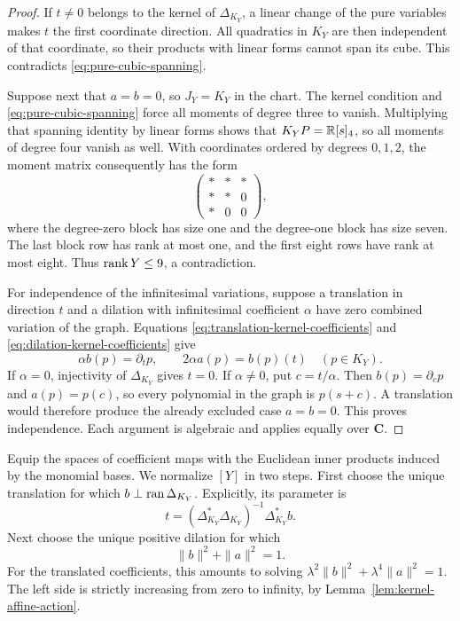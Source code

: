 \begin{proof}
If $t\ne0$ belongs to the kernel of $\Delta_{K_Y}$, a linear change of
the pure variables makes $t$ the first coordinate direction. All
quadratics in $K_Y$ are then independent of that coordinate, so their
products with linear forms cannot span its cube. This contradicts
\eqref{eq:pure-cubic-spanning}.

Suppose next that $a=b=0$, so $J_Y=K_Y$ in the chart. The kernel
condition and \eqref{eq:pure-cubic-spanning} force all moments of
degree three to vanish. Multiplying that spanning identity by linear
forms shows that $K_YP=\mathbb R[s]_4$, so all moments of degree four vanish
as well. With coordinates ordered by degrees $0,1,2$, the moment
matrix consequently has the form
\[
 \begin{pmatrix}
  *&*&*\\ *&*&0\\ *&0&0
 \end{pmatrix},
\]
where the degree-zero block has size one and the degree-one block
has size seven. The last block row has rank at most one, and the
first eight rows have rank at most eight. Thus $\operatorname{rank} Y\le9$, a
contradiction.

For independence of the infinitesimal variations, suppose a translation
in direction $t$ and a dilation with infinitesimal coefficient $\alpha$
have zero combined variation of the graph. Equations
\eqref{eq:translation-kernel-coefficients} and
\eqref{eq:dilation-kernel-coefficients} give
\[
 \alpha b(p)=\partial_t p,
 \qquad 2\alpha a(p)=b(p)(t)
 \quad(p\in K_Y).
\]
If $\alpha=0$, injectivity of $\Delta_{K_Y}$ gives $t=0$.
If $\alpha\ne0$, put $c=t/\alpha$. Then
$b(p)=\partial_c p$ and $a(p)=p(c)$, so every polynomial in the graph
is $p(s+c)$. A translation would therefore produce the already
excluded case $a=b=0$. This proves independence. Each argument is
algebraic and applies equally over $\mathbf C$.
\end{proof}

Equip the spaces of coefficient maps with the Euclidean inner
products induced by the monomial bases. We normalize $[Y]$ in two
steps. First choose the unique translation for which
$b\perp\operatorname{ran}\Delta_{K_Y}$. Explicitly, its parameter is
\[
 t=(\Delta_{K_Y}^*\Delta_{K_Y})^{-1}\Delta_{K_Y}^*b.
\]
Next choose the unique positive dilation for which
\begin{equation}
\label{eq:kernel-normalization}
 \|b\|^2+\|a\|^2=1.
\end{equation}
For the translated coefficients, this amounts to solving
$\lambda^2\|b\|^2+\lambda^4\|a\|^2=1$. The left side is strictly
increasing from zero to infinity, by Lemma~\ref{lem:kernel-affine-action}.

